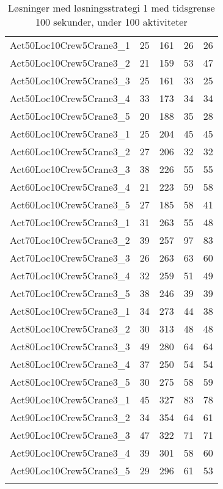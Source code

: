 \begin{center}
\begin{longtable}{ | l | c | c | c | c | }
Act50Loc10Crew5Crane3\_1	&	25	&	161	&	26	&	26	\\
Act50Loc10Crew5Crane3\_2	&	21	&	159	&	53	&	47	\\
Act50Loc10Crew5Crane3\_3	&	25	&	161	&	33	&	25	\\
Act50Loc10Crew5Crane3\_4	&	33	&	173	&	34	&	34	\\
Act50Loc10Crew5Crane3\_5	&	20	&	188	&	35	&	28	\\
Act60Loc10Crew5Crane3\_1	&	25	&	204	&	45	&	45	\\
Act60Loc10Crew5Crane3\_2	&	27	&	206	&	32	&	32	\\
Act60Loc10Crew5Crane3\_3	&	38	&	226	&	55	&	55	\\
Act60Loc10Crew5Crane3\_4	&	21	&	223	&	59	&	58	\\
Act60Loc10Crew5Crane3\_5	&	27	&	185	&	58	&	41	\\
Act70Loc10Crew5Crane3\_1	&	31	&	263	&	55	&	48	\\
Act70Loc10Crew5Crane3\_2	&	39	&	257	&	97	&	83	\\
Act70Loc10Crew5Crane3\_3	&	26	&	263	&	63	&	60	\\
Act70Loc10Crew5Crane3\_4	&	32	&	259	&	51	&	49	\\
Act70Loc10Crew5Crane3\_5	&	38	&	246	&	39	&	39	\\
Act80Loc10Crew5Crane3\_1	&	34	&	273	&	44	&	38	\\
Act80Loc10Crew5Crane3\_2	&	30	&	313	&	48	&	48	\\
Act80Loc10Crew5Crane3\_3	&	49	&	280	&	64	&	64	\\
Act80Loc10Crew5Crane3\_4	&	37	&	250	&	54	&	54	\\
Act80Loc10Crew5Crane3\_5	&	30	&	275	&	58	&	59	\\
Act90Loc10Crew5Crane3\_1	&	45	&	327	&	83	&	78	\\
Act90Loc10Crew5Crane3\_2	&	34	&	354	&	64	&	61	\\
Act90Loc10Crew5Crane3\_3	&	47	&	322	&	71	&	71	\\
Act90Loc10Crew5Crane3\_4	&	39	&	301	&	58	&	60	\\
Act90Loc10Crew5Crane3\_5	&	29	&	296	&	61	&	53	\\
\hline					
\caption{Løsninger med løsningsstrategi 1 med tidsgrense 100 sekunder, under 100 aktiviteter}														
\label{tab:solutionAssignAltRFSTF100s}					
\end{longtable}									
\end{center}	

